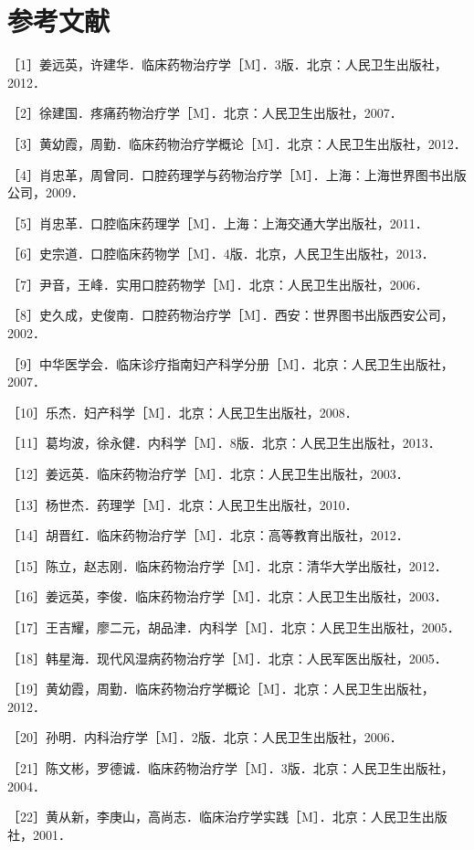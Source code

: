 \chapter{参考文献}

［1］姜远英，许建华．临床药物治疗学［M］．3版．北京：人民卫生出版社，2012．

［2］徐建国．疼痛药物治疗学［M］．北京：人民卫生出版社，2007．

［3］黄幼霞，周勤．临床药物治疗学概论［M］．北京：人民卫生出版社，2012．

［4］肖忠革，周曾同．口腔药理学与药物治疗学［M］．上海：上海世界图书出版公司，2009．

［5］肖忠革．口腔临床药理学［M］．上海：上海交通大学出版社，2011．

［6］史宗道．口腔临床药物学［M］．4版．北京，人民卫生出版社，2013．

［7］尹音，王峰．实用口腔药物学［M］．北京：人民卫生出版社，2006．

［8］史久成，史俊南．口腔药物治疗学［M］．西安：世界图书出版西安公司，2002．

［9］中华医学会．临床诊疗指南妇产科学分册［M］．北京：人民卫生出版社，2007．

［10］乐杰．妇产科学［M］．北京：人民卫生出版社，2008．

［11］葛均波，徐永健．内科学［M］．8版．北京：人民卫生出版社，2013．

［12］姜远英．临床药物治疗学［M］．北京：人民卫生出版社，2003．

［13］杨世杰．药理学［M］．北京：人民卫生出版社，2010．

［14］胡晋红．临床药物治疗学［M］．北京：高等教育出版社，2012．

［15］陈立，赵志刚．临床药物治疗学［M］．北京：清华大学出版社，2012．

［16］姜远英，李俊．临床药物治疗学［M］．北京：人民卫生出版社，2003．

［17］王吉耀，廖二元，胡品津．内科学［M］．北京：人民卫生出版社，2005．

［18］韩星海．现代风湿病药物治疗学［M］．北京：人民军医出版社，2005．

［19］黄幼霞，周勤．临床药物治疗学概论［M］．北京：人民卫生出版社，2012．

［20］孙明．内科治疗学［M］．2版．北京：人民卫生出版社，2006．

［21］陈文彬，罗德诚．临床药物治疗学［M］．3版．北京：人民卫生出版社，2004．

［22］黄从新，李庚山，高尚志．临床治疗学实践［M］．北京：人民卫生出版社，2001．


